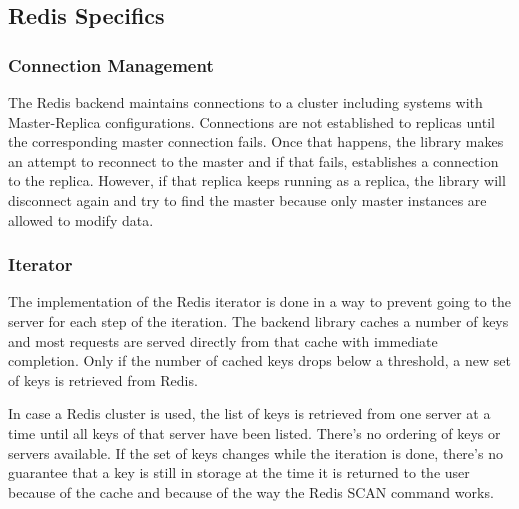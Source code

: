 \newpage
\subsection{Redis Specifics}

\subsubsection{Connection Management}
The Redis backend maintains connections to a cluster including systems
with Master-Replica configurations.  Connections are not established
to replicas until the corresponding master connection fails. Once that
happens, the library makes an attempt to reconnect to the master and
if that fails, establishes a connection to the replica.  However, if
that replica keeps running as a replica, the library will disconnect
again and try to find the master because only master instances are
allowed to modify data.

\subsubsection{Iterator}
The implementation of the Redis iterator is done in a way to prevent
going to the server for each step of the iteration.  The backend
library caches a number of keys and most requests are served directly
from that cache with immediate completion.  Only if the number of
cached keys drops below a threshold, a new set of keys is retrieved
from Redis.

In case a Redis cluster is used, the list of keys is retrieved from
one server at a time until all keys of that server have been
listed. There's no ordering of keys or servers available. If the set
of keys changes while the iteration is done, there's no guarantee that
a key is still in storage at the time it is returned to the user
because of the cache and because of the way the Redis SCAN command
works.


